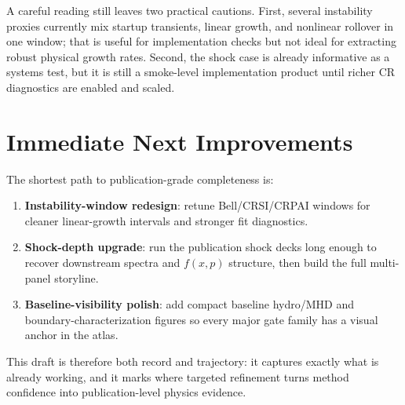 \documentclass[twocolumn]{aastex701}
\begin{document}
A careful reading still leaves two practical cautions. First, several
instability proxies currently mix startup transients, linear growth, and
nonlinear rollover in one window; that is useful for implementation checks but
not ideal for extracting robust physical growth rates. Second, the shock case is
already informative as a systems test, but it is still a smoke-level
implementation product until richer CR diagnostics are enabled and scaled.

\section{Immediate Next Improvements}

The shortest path to publication-grade completeness is:
\begin{enumerate}
\item \textbf{Instability-window redesign}: retune Bell/CRSI/CRPAI windows for
cleaner linear-growth intervals and stronger fit diagnostics.
\item \textbf{Shock-depth upgrade}: run the publication shock decks long enough
to recover downstream spectra and $f(x,p)$ structure, then build the full
multi-panel storyline.
\item \textbf{Baseline-visibility polish}: add compact baseline hydro/MHD and
boundary-characterization figures so every major gate family has a visual anchor
in the atlas.
\end{enumerate}

This draft is therefore both record and trajectory: it captures exactly what is
already working, and it marks where targeted refinement turns method confidence
into publication-level physics evidence.
\end{document}

